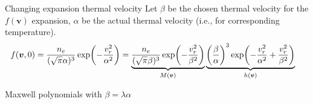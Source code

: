 \documentclass[mathserif, aspectratio=169]{beamer}
\newcommand{\vect}[1]{\boldsymbol{#1}}
\newcommand{\of}[1]{\mleft( #1 \mright)}
\begin{document}
\begin{frame}{Changing expansion thermal velocity}
	Let $\beta$ be the chosen thermal velocity for the $f(\vect{v})$ expansion, $\alpha$ be the actual thermal velocity (i.e., for corresponding temperature).
	\begin{align*}
		f(\vect{v},0) &= \frac{n_e}{(\sqrt{\pi}\alpha)^3}\exp\of{-\frac{v_r^2}{\alpha^2}} = \underbrace{\frac{n_e}{(\sqrt{\pi}\beta)^3} \exp\of{-\frac{v_r^2}{\beta^2}}}_{M(\vect{v})} \underbrace{\left(\frac{\beta}{\alpha}\right)^3 \exp\of{-\frac{v_r^2}{\alpha^2} + \frac{v_r^2}{\beta^2}}}_{h(\vect{v})} 
	\end{align*}
\end{frame}

\begin{frame}{Maxwell polynomials with $\beta=\lambda \alpha$}
	\begin{center}
\end{center}
\end{frame}
\end{document}
